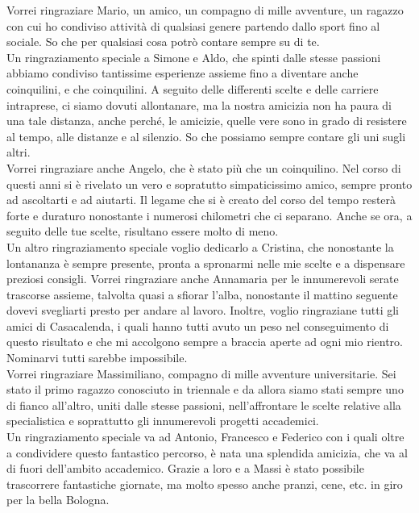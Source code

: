 \noindent Vorrei ringraziare Mario, un amico, un compagno di mille avventure, un ragazzo con cui ho condiviso attività di qualsiasi genere partendo dallo sport fino al sociale. So che per qualsiasi cosa potrò contare sempre su di te.\\

\noindent Un ringraziamento speciale a Simone e Aldo, che spinti dalle stesse passioni abbiamo condiviso tantissime esperienze assieme fino a diventare anche coinquilini, e che coinquilini. A seguito delle differenti scelte e delle carriere intraprese, ci siamo dovuti allontanare, ma la nostra amicizia non ha paura di una tale distanza, anche perché, le amicizie, quelle vere sono in grado di resistere al tempo, alle distanze e al silenzio. So che possiamo sempre contare gli uni sugli altri. \\

\noindent Vorrei ringraziare anche Angelo, che è stato più che un coinquilino. Nel corso di questi anni si è rivelato un vero e sopratutto simpaticissimo amico, sempre pronto ad ascoltarti e ad aiutarti. Il legame che si è creato del corso del tempo resterà forte e duraturo nonostante i numerosi chilometri che ci separano. Anche se ora, a seguito delle tue scelte, risultano essere molto di meno.\\

\noindent Un altro ringraziamento speciale voglio dedicarlo a Cristina, che nonostante la lontananza è sempre presente, pronta a spronarmi nelle mie scelte e a dispensare preziosi consigli. Vorrei ringraziare anche Annamaria per le innumerevoli serate trascorse assieme, talvolta quasi a sfiorar l'alba, nonostante il mattino seguente dovevi svegliarti presto per andare al lavoro. Inoltre, voglio ringraziane tutti gli amici di Casacalenda, i quali hanno tutti avuto un peso nel conseguimento di questo risultato e che mi accolgono sempre a braccia aperte ad ogni mio rientro. Nominarvi tutti sarebbe impossibile.\\

\noindent Vorrei ringraziare Massimiliano, compagno di mille avventure universitarie. Sei stato il primo ragazzo conosciuto in triennale e da allora siamo stati sempre uno di fianco all'altro, uniti dalle stesse passioni, nell'affrontare le scelte relative alla specialistica e soprattutto gli innumerevoli progetti accademici. \\
Un ringraziamento speciale va ad Antonio, Francesco e Federico con i quali oltre a condividere questo fantastico percorso, è nata una splendida amicizia, che va al di fuori dell'ambito accademico. Grazie a loro e a Massi è stato possibile trascorrere fantastiche giornate, ma molto spesso anche pranzi, cene, etc. in giro per la bella Bologna.  \\

